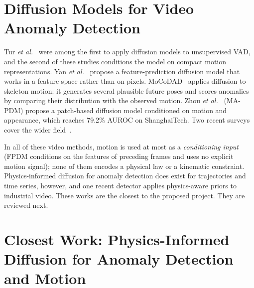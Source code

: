 \documentclass[11pt,a4paper]{article}
\begin{document}
\section{Diffusion Models for Video Anomaly Detection}
Tur \emph{et al.}~\cite{tur2023exploring,tur2023unsupervised} were among the first to apply diffusion models to unsupervised VAD, and the second of these studies conditions the model on compact motion representations. Yan \emph{et al.}~\cite{yan2023feature} propose a feature-prediction diffusion model that works in a feature space rather than on pixels. MoCoDAD~\cite{flaborea2023multimodal} applies diffusion to skeleton motion: it generates several plausible future poses and scores anomalies by comparing their distribution with the observed motion. Zhou \emph{et al.}~\cite{zhou2025video} (MA-PDM) propose a patch-based diffusion model conditioned on motion and appearance, which reaches 79.2\% AUROC on ShanghaiTech. Two recent surveys cover the wider field~\cite{liu2025survey,surveyadg2025}.

In all of these video methods, motion is used at most as a \emph{conditioning input} (FPDM conditions on the features of preceding frames and uses no explicit motion signal); none of them encodes a physical law or a kinematic constraint. Physics-informed diffusion for anomaly detection does exist for trajectories and time series, however, and one recent detector applies physics-aware priors to industrial video. These works are the closest to the proposed project. They are reviewed next.

\section{Closest Work: Physics-Informed Diffusion for Anomaly Detection and Motion}
\label{sec:closest}
\end{document}
